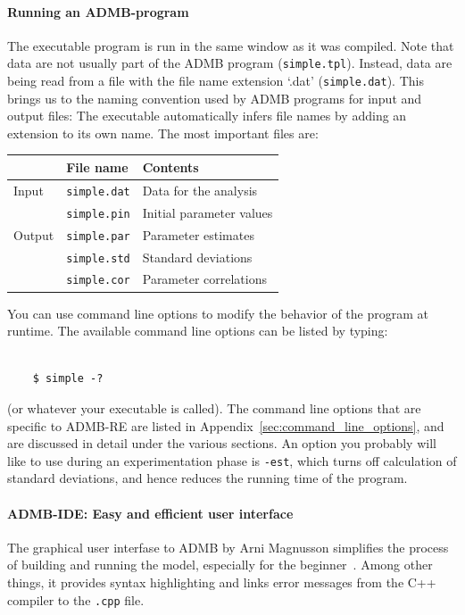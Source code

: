 \documentclass[12pt,letter,reqno]{book}
\begin{document}
\paragraph{Running an ADMB-program}
The executable program is run in the same window as it was compiled. Note that data
are not usually part of the ADMB program (\texttt{simple.tpl}). Instead, data are being read from a file with
the file name extension `.dat' (\texttt{simple.dat}). This brings us to the naming convention used by ADMB programs for
input and output files: The executable automatically infers file names by adding an extension to its own
name. The most important files are:
\begin{center}
\begin{tabular}{lll}
& \textbf{File name} & \textbf{Contents} \\ \hline
Input & \texttt{simple.dat} & Data for the analysis \\
& \texttt{simple.pin} & Initial parameter values \\ \hline
Output & \texttt{simple.par} & Parameter estimates \\
& \texttt{simple.std} & Standard deviations \\
& \texttt{simple.cor} & Parameter correlations
\end{tabular}
\end{center}
You can use command line options to modify the behavior of the program at runtime. The available command line options can be
listed by typing:
\begin{lstlisting}

    $ simple -?

\end{lstlisting}
(or whatever your executable is called). The command line options that
are specific to ADMB-RE are listed in Appendix~\ref{sec:command_line_options}, and are discussed in detail under the various sections. An
option you probably will like to use during an experimentation phase is \texttt{-est}, which turns off
calculation of standard deviations, and hence reduces the running time of the program.

\paragraph{ADMB-IDE: Easy and efficient user interface}
The graphical user interfase to ADMB by Arni Magnusson simplifies the process
of building and running the model, especially for the beginner~\cite{admb_news_july09}. Among other things, it provides syntax highlighting
and links error messages from the C++ compiler to the \texttt{.cpp} file.
\end{document}
